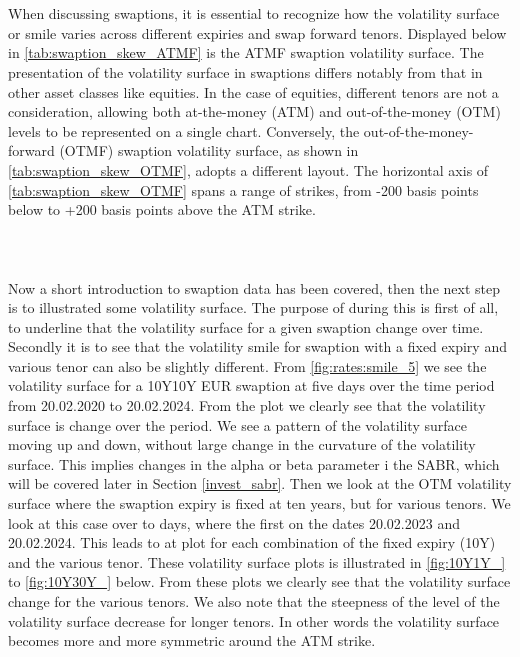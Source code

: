 \\\\
When discussing swaptions, it is essential to recognize how the volatility surface or smile varies across different expiries and swap 
forward tenors. Displayed below in \autoref{tab:swaption_skew_ATMF} is the ATMF swaption volatility surface. 
The presentation of the volatility surface in swaptions differs notably from that in other asset classes like equities. 
In the case of equities, different tenors are not a consideration, allowing both at-the-money (ATM) and out-of-the-money (OTM) 
levels to be represented on a single chart. Conversely, the out-of-the-money-forward (OTMF) swaption volatility surface, 
as shown in \autoref{tab:swaption_skew_OTMF}, adopts a different layout. The horizontal axis of 
\autoref{tab:swaption_skew_OTMF} spans a range of strikes, from -200 basis points below to +200 basis points above the ATM strike.
\\\\
\\\\
Now a short introduction to swaption data has been covered, then the next step is to illustrated some 
volatility surface. The purpose of during this is first of all, to underline that the volatility surface for a 
given swaption change over time. Secondly it is to see that the volatility smile for swaption with a fixed
expiry and various tenor can also be slightly different.  From \autoref{fig:rates:smile_5} we see the volatility surface
for a 10Y10Y EUR swaption at five days over the time period from 20.02.2020 to 20.02.2024. From the plot 
we clearly see that the volatility surface is change over the period. We see a pattern of the volatility surface moving 
up and down, without large change in the curvature of the volatility surface. This implies changes in the alpha or beta parameter
i the SABR, which will be covered later in Section \ref{invest_sabr}. Then we look at the OTM volatility surface
where the swaption expiry is fixed at ten years, but for various tenors. We look at this case over to days, where the first 
on the dates 20.02.2023 and 20.02.2024. This leads to at plot for each combination of the fixed expiry (10Y) and the various tenor. 
These volatility surface plots is illustrated in \autoref{fig:10Y1Y_} to \autoref{fig:10Y30Y_} below.
From these plots we clearly see that the volatility surface change for the various tenors. 
We also note that the steepness of the level of the volatility surface decrease for longer tenors. 
In other words the volatility surface becomes more and more symmetric around the ATM strike. 
